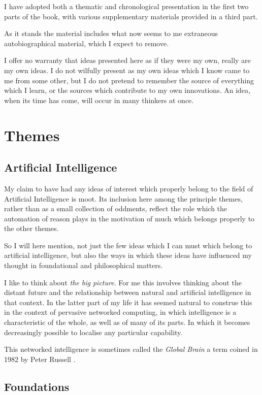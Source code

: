 \documentclass[10pt,titlepage]{book}
\begin{document}
I have adopted both a thematic and chronological presentation in the first two parts of the book, with various supplementary materials provided in a third part.

As it stands the material includes what now seems to me extraneous autobiographical material, which I expect to remove.

I offer no warranty that ideas presented here as if they were my own, really are my own ideas.
I do not wilfully present as my own ideas which I know came to me from some other, but I do not pretend to remember the source of everything which I learn, or the sources which contribute to my own innovations.
An idea, when its time has come, will occur in many thinkers at once.

\part{Themes}

\chapter{Artificial Intelligence}

My claim to have had any ideas of interest which properly belong to the field of Artificial Intelligence is moot.
Its inclusion here among the principle themes, rather than as a small collection of oddments, reflect the role which the automation of reason plays in the motivation of much which belongs properly to the other themes.

So I will here mention, not just the few ideas which I can must which belong to artificial intelligence, but also the ways in which these ideas have influenced my thought in foundational and philosophical matters.

I like to think about {\it the big picture}.
For me this involves thinking about the distant future and the relationship between natural and artificial intelligence in that context.
In the latter part of my life it has seemed natural to construe this in the context of pervasive networked computing, in which intelligence is a characteristic of the whole, as well as of many of its parts.
In which it becomes decreasingly possible to localise any particular capability.

This networked intelligence is sometimes called the {\it Global Brain} a term coined in 1982 by Peter Russell \cite{russellp82}.

\chapter{Foundations}
\end{document}

